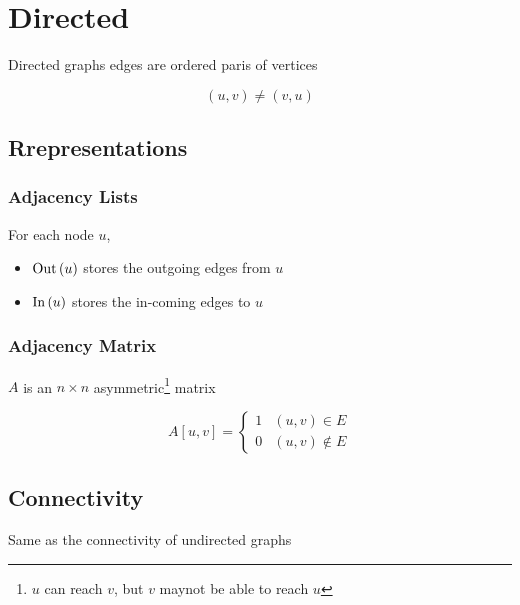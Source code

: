 \chapter{Directed}

Directed graphs edges are ordered paris of vertices

\begin{equation}
  \left( u, v \right) \ne \left( v, u \right)
\end{equation}

\section{Rrepresentations}

  \subsection{Adjacency Lists}

    For each node $ u $,

    \begin{itemize}
      \item $ \operatorname{Out}\left( u \right) $ stores the outgoing edges from $ u $
      \item $ \operatorname{In}\left( u \right) $ stores the in-coming edges to $ u $
    \end{itemize}

  \subsection{Adjacency Matrix}

    $ A $ is an $ n \times n $ asymmetric\footnote{$ u $ can reach $ v $,
    but $ v $ maynot be able to reach $ u $} matrix

    \begin{equation}
      A\left[ u, v \right] =
      \begin{cases}
        1 & \left( u, v \right) \in E \\
        0 & \left( u, v \right) \notin E
      \end{cases}
    \end{equation}

\section{Connectivity}

  Same as the connectivity of undirected graphs

